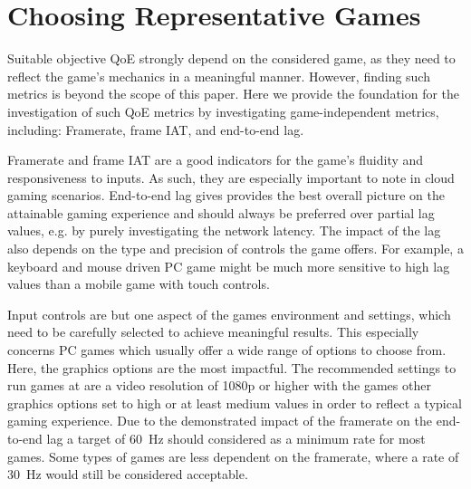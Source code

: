 \section{Choosing Representative Games}
\label{sec:game-criteria}

Suitable objective \gls{QoE} strongly depend on the considered game, as they need to reflect the game's mechanics in a meaningful manner.
However, finding such metrics is beyond the scope of this paper.
Here we provide the foundation for the investigation of such \gls{QoE} metrics by investigating game-independent metrics, including: Framerate, frame \gls{IAT}, and end-to-end lag.

Framerate and frame \gls{IAT} are a good indicators for the game's fluidity and responsiveness to inputs.
As such, they are especially important to note in cloud gaming scenarios.
End-to-end lag gives provides the best overall picture on the attainable gaming experience and should always be preferred over partial lag values, e.g. by purely investigating the network latency.
The impact of the lag also depends on the type and precision of controls the game offers.
For example, a keyboard and mouse driven PC game might be much more sensitive to high lag values than a mobile game with touch controls.

Input controls are but one aspect of the games environment and settings, which need to be carefully selected to achieve meaningful results.
This especially concerns PC games which usually offer a wide range of options to choose from.
Here, the graphics options are the most impactful.
The recommended settings to run games at are a video resolution of 1080p or higher with the games other graphics options set to high or at least medium values in order to reflect a typical gaming experience. 
Due to the demonstrated impact of the framerate on the end-to-end lag a target of \SI{60}{\hertz} should considered as a minimum rate for most games.
Some types of games are less dependent on the framerate, where a rate of \SI{30}{\hertz} would still be considered acceptable. 



